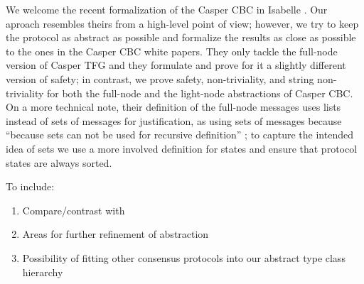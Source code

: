 We welcome the recent formalization of the Casper CBC in Isabelle \cite{Nakamura}.
Our aproach resembles theirs from a high-level point of view; however, we try to keep the protocol as abstract as possible and formalize the results as close as possible to the ones in the Casper CBC white papers.
They only tackle the full-node version of Casper TFG and they formulate and prove for it a slightly different version of safety; in contrast, we prove safety, non-triviality, and string non-triviality for both the full-node and the light-node abstractions of Casper CBC.
On a more technical note, their definition of the full-node messages uses lists instead of sets of messages for justification, as using sets of messages because ``because sets can not be used for recursive definition'' \cite{Nakamura-github}; to capture the intended idea of sets we use a more involved definition for states and ensure that protocol states are always sorted.



To include: 
\begin{enumerate} 
	\item Compare/contrast with \cite{Nakamura}
	\item Areas for further refinement of abstraction
	\item Possibility of fitting other consensus protocols into our abstract type class hierarchy
\end{enumerate}
